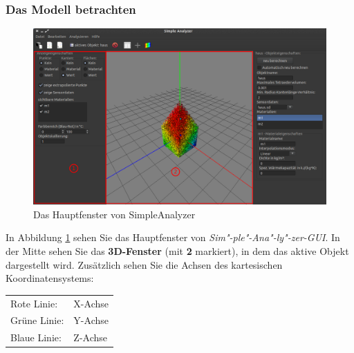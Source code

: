 \documentclass[10pt,a5paper,twoside,titlepage]{scrartcl}
\begin{document}
	\subsubsection{Das Modell betrachten}
	\label{subsec:sa_viewprops}
	\begin{figure}
	\centering
	\includegraphics[trim=0cm 0cm 0cm 0cm,clip=true,scale=.2]{Simple_Analyzer_viewprops.png}
	\caption{Das Hauptfenster von SimpleAnalyzer}
	\label{fig:sa_viewprops}
	\end{figure}
	In Abbildung \ref{fig:sa_viewprops} sehen Sie das Hauptfenster von \emph{Sim"-ple"-Ana"-ly"-zer-GUI}. In der Mitte sehen Sie das \textbf{3D-Fenster} (mit \textbf{2} markiert), in dem das aktive Objekt dargestellt wird. Zusätzlich sehen Sie die Achsen des kartesischen Koordinatensystems:\\
	
	\begin{tabular}{ll}
	Rote Linie: & X-Achse\\
	Grüne Linie: & Y-Achse\\
	Blaue Linie: & Z-Achse\\
	\end{tabular}\\
	
\end{document}
